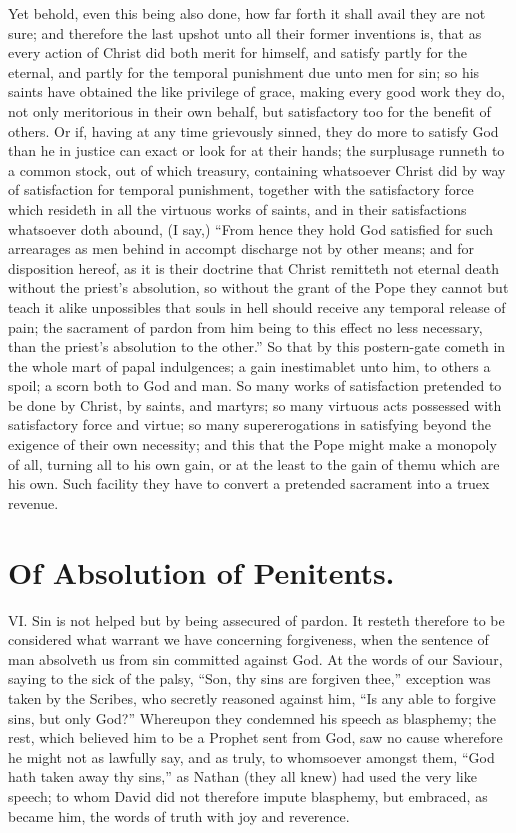 Yet behold, even this being also done, how far forth it shall avail they are not sure; and therefore the last upshot unto all their former inventions is, that as every action of Christ did both merit for himself, and satisfy partly for the eternal, and partly for the temporal punishment due unto men for sin; so his saints have obtained the like privilege of grace, making every good work they do, not only meritorious in their own behalf, but satisfactory too for the benefit of others. Or if, having at any time grievously sinned, they do more to satisfy God than he in justice can exact or look for at their hands; the surplusage runneth to a common stock, out of which treasury, containing whatsoever Christ did by way of satisfaction for temporal punishment, together with the satisfactory force which resideth in all the virtuous works of saints, and in their satisfactions whatsoever doth abound, (I say,) “From hence they hold God satisfied for such arrearages as men behind in accompt discharge not by other means; and for disposition hereof, as it is their doctrine that Christ remitteth not eternal death without the priest’s absolution, so without the grant of the Pope they cannot but teach it alike unpossibles that souls in hell should receive any temporal release of pain; the sacrament of pardon from him being to this effect no less necessary, than the priest’s absolution to the other.” So that by this postern-gate cometh in the whole mart of papal indulgences; a gain inestimablet unto him, to others a spoil; a scorn both to God and man. So many works of satisfaction pretended to be done by Christ, by saints, and martyrs; so many virtuous acts possessed with satisfactory force and virtue; so many  supererogations in satisfying beyond the exigence of their own necessity; and this that the Pope might make a monopoly of all, turning all to his own gain, or at the least to the gain of themu which are his own. Such facility they have to convert a pretended sacrament into a truex revenue.

\section*{Of Absolution of Penitents.}

VI. Sin is not helped but by being assecured of pardon. It resteth therefore to be considered what warrant we have concerning forgiveness, when the sentence of man absolveth us from sin committed against God. At the words of our Saviour, saying to the sick of the palsy, “Son, thy sins are forgiven thee,” exception was taken by the Scribes, who secretly reasoned against him, “Is any able to forgive sins, but only God?” Whereupon they condemned his speech as blasphemy; the rest, which believed him to be a Prophet sent from God, saw no cause wherefore he might not as lawfully say, and as truly, to whomsoever amongst them, “God hath taken away thy sins,” as Nathan (they all knew) had used the very like speech; to whom David did not therefore impute blasphemy, but embraced, as became him, the words of truth with joy and reverence.

